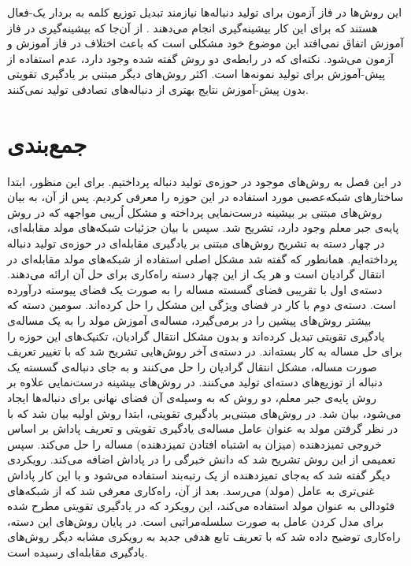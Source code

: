 این روش‌ها در فاز آزمون برای تولید دنباله‌ها نیازمند تبدیل توزیع کلمه به بردار یک-فعال هستند که برای این کار بیشینه‌گیری انجام می‌دهند
\cite{Gulrajaniy17ImprovedWasserstein, press2017langwasserstein}.
از آن‌جا که بیشینه‌گیری در فاز آموزش اتفاق نمی‌افتد این موضوع خود مشکلی است که باعث اختلاف در فاز آموزش و آزمون می‌شود.
\newline
نکته‌ای که در رابطه‌ی دو روش گفته شده وجود دارد، عدم استفاده از پیش-آموزش برای تولید نمونه‌ها است. اکثر روش‌های دیگر مبتنی بر یادگیری تقویتی بدون پیش-آموزش نتایج بهتری از دنباله‌های تصادفی تولید نمی‌کنند.

\section{جمع‌بندی}
در این فصل به روش‌های موجود در حوزه‌ی تولید دنباله پرداختیم. برای این منظور، ابتدا  ساختارهای شبکه‌عصبی مورد استفاده در این حوزه را معرفی کردیم. پس از  آن، به بیان روش‌های مبتنی بر بیشینه درست‌نمایی پرداخته و مشکل اُریبی مواجهه که در روش پایه‌ی  جبر معلم وجود دارد، تشریح شد.
سپس با بیان جزئیات شبکه‌های مولد مقابله‌ای، در چهار دسته به تشریح روش‌های مبتنی بر یادگیری مقابله‌ای در حوزه‌ی تولید دنباله پرداخته‌ایم. همانطور که گفته شد مشکل اصلی استفاده از شبکه‌های مولد مقابله‌ای در انتقال گرادیان است و هر یک از این چهار دسته راه‌کاری برای حل آن ارائه می‌دهند. دسته‌ی اول با تقریبی فضای گسسته مساله را به صورت یک فضای پیوسته درآورده است. دسته‌ی دوم با کار در فضای ویژگی این مشکل را حل کرده‌اند. سومین دسته  که بیشتر روش‌های پیشین را در برمی‌گیرد، مساله‌‌ی آموزش مولد را به یک مساله‌ی یادگیری تقویتی تبدیل کرده‌اند و بدون مشکل انتقال گرادیان، تکنیک‌های این حوزه را برای حل مساله به کار بسته‌اند. در دسته‌ی آخر روش‌هایی تشریح شد که با تغییر تعریف صورت مساله، مشکل انتقال گرادیان را حل می‌کنند و به جای دنباله‌ی گسسته یک دنباله از توزیع‌های دسته‌ای تولید می‌کنند.
\newline
در روش‌های بیشینه درست‌نمایی علاوه بر روش پایه‌ی جبر معلم، دو روش که به وسیله‌ی آن فضای نهانی برای دنباله‌ها ایجاد می‌شود، بیان شد.
\newline
در روش‌های مبتنی‌بر یادگیری تقویتی، ابتدا روش اولیه بیان شد که با در نظر گرفتن مولد به عنوان عامل مساله‌ی یادگیری تقویتی و تعریف پاداش بر اساس خروجی تمیزدهنده (میزان به اشتباه افتادن تمیزدهنده) مساله را حل می‌کند. سپس تعمیمی از این روش تشریح شد که دانش خبرگی را در پاداش اضافه می‌کند. رویکردی دیگر گفته شد که به‌جای تمیزدهنده از یک رتبه‌بند استفاده می‌شود و با این کار پاداش غنی‌تری به عامل (مولد) می‌رسد. بعد از آن، راه‌کاری معرفی شد که از شبکه‌های فئودالی به عنوان مولد استفاده می‌کند، این رویکرد که در یادگیری تقویتی مطرح شده برای مدل کردن عامل به صورت سلسله‌مراتبی است. در پایان روش‌های این دسته، راه‌کاری توضیح داده شد که با تعریف تابع هدفی جدید به رویکری مشابه دیگر روش‌های یادگیری مقابله‌ای رسیده است.
